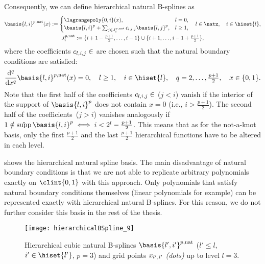 Consequently, we can define hierarchical natural B-splines as
\begin{subequations}
  \begin{gather}
    \basis{l,i}^{p,\ntrl}(x)
    :=
    \begin{cases}
      \lagrangepoly{0,i}(x),&
      l = 0,\\
      \basis{l,i}^p +
      \sum_{j \in J_i^{p,\ntrl}} c_{l,i,j} \basis{l,j}^p,&
      l \ge 1,
    \end{cases}\quad
    l \in \natz,\quad
    i \in \hiset{l},\\
    J_i^{p,\ntrl}
    := \{i+1-\tfrac{p+1}{2}, \dotsc, i-1\} \cup
    \{i+1, \dotsc, i-1+\tfrac{p+1}{2}\},
  \end{gather}
\end{subequations}
where the coefficients $c_{l,i,j} \in \real$ are chosen such that
the natural boundary conditions are satisfied:
\begin{equation}
  \frac{\diff^q}{\dx^q} \basis{l,i}^{p,\ntrl}(x)
  = 0,\quad
  l \ge 1,\quad
  i \in \hiset{l},\quad
  q = 2, \dotsc, \tfrac{p+1}{2},\quad
  x \in \{0, 1\}.
\end{equation}
Note that the first half of the coefficients $c_{l,i,j} \in \real$
($j < i$) vanish if the interior of the support of $\basis{l,i}^p$
does not contain $x = 0$
(i.e., $i > \tfrac{p+1}{2}$).
The second half of the coefficients~($j > i$) vanishes analogously
if $1 \notin \interiorsupp \basis{l,i}^p \iff i < 2^l - \tfrac{p+1}{2}$.
This means that as for the not-a-knot basis,
only the first $\tfrac{p+1}{2}$ and the last $\tfrac{p+1}{2}$
hierarchical functions have to be altered in each level.

 shows the hierarchical natural spline basis.
The main disadvantage of natural boundary conditions is that
we are not able to replicate arbitrary polynomials exactly on $\clint{0, 1}$
with this approach.
Only polynomials that satisfy natural boundary conditions themselves
(linear polynomials for example)
can be represented exactly with hierarchical natural B-splines.
For this reason, we do not further consider this basis in the
rest of the thesis.

\begin{SCfigure}
  \texttt{[image: hierarchicalBSpline\_9]}%
  \caption{%
    Hierarchical cubic natural B-splines
    $\basis{l',i'}^{p,\ntrl}$
    ($l' \le l$, $i' \in \hiset{l'}$, $p = 3$) and
    grid points $x_{l',i'}$ \emph{(dots)} up to level $l = 3$.%
  }%
  \label{fig:naturalBSpline}%
\end{SCfigure}
